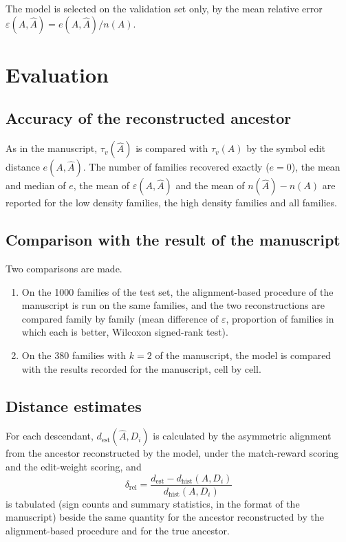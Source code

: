 \documentclass[11pt,a4paper]{article}
\newcommand{\dest}{d_{\mathrm{est}}}
\newcommand{\dhist}{d_{\mathrm{hist}}}
\newcommand{\drel}{\delta_{\mathrm{rel}}}
\newcommand{\Ahat}{\hat{A}}
\begin{document}
The model is selected on the validation set only, by the mean relative error $\varepsilon(A,\Ahat)=e(A,\Ahat)/n(A)$.

\section{Evaluation}

\subsection{Accuracy of the reconstructed ancestor}

As in the manuscript, $\tau_v(\Ahat)$ is compared with $\tau_v(A)$ by the symbol edit distance $e(A,\Ahat)$. The number of families recovered exactly ($e=0$), the mean and median of $e$, the mean of $\varepsilon(A,\Ahat)$ and the mean of $n(\Ahat)-n(A)$ are reported for the low density families, the high density families and all families.

\subsection{Comparison with the result of the manuscript}

Two comparisons are made.
\begin{enumerate}
\item On the 1000 families of the test set, the alignment-based procedure of the manuscript is run on the same families, and the two reconstructions are compared family by family (mean difference of $\varepsilon$, proportion of families in which each is better, Wilcoxon signed-rank test).
\item On the 380 families with $k=2$ of the manuscript, the model is compared with the results recorded for the manuscript, cell by cell.
\end{enumerate}

\subsection{Distance estimates}

For each descendant, $\dest(\Ahat,D_i)$ is calculated by the asymmetric alignment from the ancestor reconstructed by the model, under the match-reward scoring and the edit-weight scoring, and
\[
\drel=\frac{\dest-\dhist(A,D_i)}{\dhist(A,D_i)}
\]
is tabulated (sign counts and summary statistics, in the format of the manuscript) beside the same quantity for the ancestor reconstructed by the alignment-based procedure and for the true ancestor.
\end{document}
